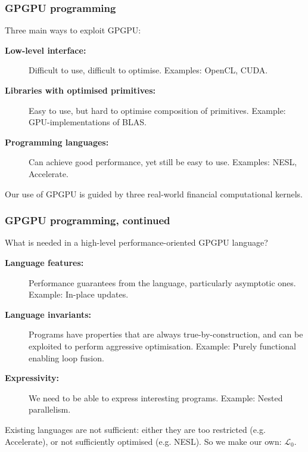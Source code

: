 \documentclass{beamer}
\newcommand{\LO}{$\mathcal{L}_0$}
\begin{document}
\begin{frame}
  \frametitle{GPGPU programming}

  Three main ways to exploit GPGPU:

  \begin{description}
  \item[\bf Low-level interface:] Difficult to use,
    difficult to optimise.  Examples: OpenCL, CUDA.
  \item[\bf Libraries with optimised primitives:] Easy to use, but hard to
    optimise composition of primitives.  Example: GPU-implementations
    of BLAS.
  \item[\bf Programming languages:] Can achieve good performance, yet
    still be easy to use.  Examples: NESL, Accelerate.
  \end{description}

  Our use of GPGPU is guided by three real-world financial computational
  kernels.
\end{frame}

\begin{frame}
  \frametitle{GPGPU programming, continued}

  What is needed in a high-level performance-oriented GPGPU language?

  \begin{description}
  \item[\bf Language features:] Performance guarantees from the language,
    particularly asymptotic ones.  Example: In-place updates.
  \item[\bf Language invariants:] Programs have properties that are always
    true-by-construction, and can be exploited to perform aggressive
    optimisation.  Example: Purely functional enabling loop fusion.
  \item[\bf Expressivity:] We need to be able to express interesting
    programs.  Example: Nested parallelism.
  \end{description}

  Existing languages are not sufficient: either they are too
  restricted (e.g. Accelerate), or not sufficiently optimised
  (e.g. NESL).  So we make our own: \LO{}.
\end{frame}

\end{document}
